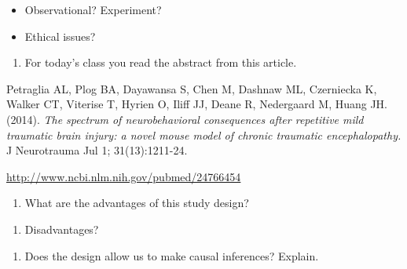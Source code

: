 \documentclass[
]{report}
\providecommand{\tightlist}{%
  \setlength{\itemsep}{0pt}\setlength{\parskip}{0pt}}
\begin{document}
\begin{itemize}
\tightlist
\item
  Observational? Experiment?
\end{itemize}

\vspace{0.5in}

\begin{itemize}
\tightlist
\item
  Ethical issues?
\end{itemize}

\vspace{0.5in}

\begin{enumerate}
\def\labelenumi{\arabic{enumi}.}
\setcounter{enumi}{2}
\tightlist
\item
  For today's class you read the abstract from this article.
\end{enumerate}

Petraglia AL, Plog BA, Dayawansa S, Chen M, Dashnaw ML, Czerniecka K, Walker CT, Viterise T, Hyrien O, Iliff JJ, Deane R, Nedergaard M, Huang JH. (2014). \emph{The spectrum of neurobehavioral consequences after repetitive mild traumatic brain injury: a novel mouse model of chronic traumatic encephalopathy.} J Neurotrauma Jul 1; 31(13):1211-24.

\url{http://www.ncbi.nlm.nih.gov/pubmed/24766454}

\begin{enumerate}
\def\labelenumi{(\alph{enumi})}
\tightlist
\item
  What are the advantages of this study design?
\end{enumerate}

\vspace{0.5in}

\begin{enumerate}
\def\labelenumi{(\alph{enumi})}
\setcounter{enumi}{1}
\tightlist
\item
  Disadvantages?
\end{enumerate}

\vspace{0.5in}

\begin{enumerate}
\def\labelenumi{(\alph{enumi})}
\setcounter{enumi}{2}
\tightlist
\item
  Does the design allow us to make causal inferences? Explain.
\end{enumerate}

\vspace{0.5in}
\end{document}
